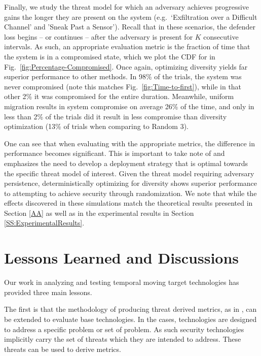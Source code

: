 \documentclass{acm_proc_article-sp}
\begin{document}
Finally, we study the threat model for which an adversary achieves progressive gains the longer they are present on the system (e.g.\ `Exfiltration over a Difficult Channel' and 'Sneak Past a Sensor'). Recall that in these scenarios, the defender loss begins -- or continues -- after the adversary is present for $K$ consecutive intervals. As such, an appropriate evaluation metric is the fraction of time that the system is in a compromised state, which we plot the CDF for in Fig.\ \ref{fig:Percentage-Compromised}. Once again, optimizing diversity yields far superior performance to other methods. In 98\% of the trials, the system was never compromised (note this matches Fig.\ \ref{fig:Time-to-first}), while in that other 2\% it was compromised for the entire duration. Meanwhile, uniform migration results in system compromise on average 26\% of the time, and only in less than 2\% of the trials did it result in less compromise than diversity optimization (13\% of trials when comparing to Random 3).

One can see that when evaluating with the appropriate metrics, the difference in performance becomes significant. This is important to take note of and emphasizes the need to develop a deployment strategy that is optimal towards the specific threat model of interest. Given the threat model requiring adversary persistence, deterministically optimizing for diversity shows superior performance to attempting to achieve security through randomization. We note that while the effects discovered in these simulations match the theoretical results presented in Section \ref{AA} as well as in the experimental results in Section \ref{SS:ExperimentalResults}.



\section{Lessons Learned and Discussions}
\label{LLD}

Our work in analyzing and testing temporal moving target technologies has provided three main lessons.

The first is that the methodology of producing threat derived metrics, as in \cite{lrmetrics}, can be extended to
evaluate base technologies.  In the cases, technologies are designed to address a specific problem or set of problem.
As such security technologies implicitly carry the set of threats which they are intended to address.  These threats can
be used to derive metrics.
\end{document}
